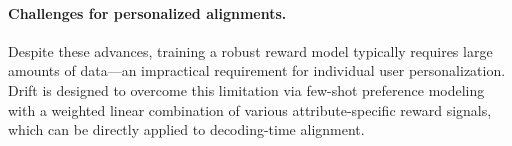 \paragraph{Challenges for personalized alignments.}

Despite these advances, training a robust reward model typically requires large amounts of data—an impractical requirement for individual user personalization. Drift is designed to overcome this limitation via few-shot preference modeling with a weighted linear combination of various attribute-specific reward signals, which can be directly applied to decoding-time alignment.
